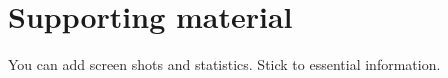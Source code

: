 \section{Supporting material}
You can add screen shots and statistics. Stick to essential information.